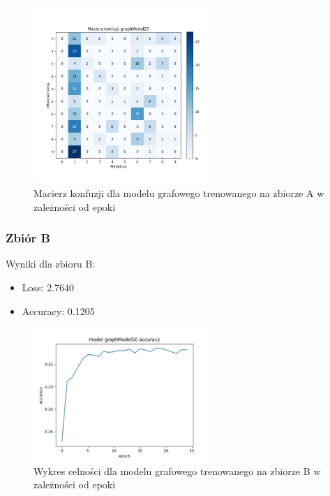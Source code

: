 \documentclass{article}
\begin{document}
\begin{figure}[H]
    \centering
    \includegraphics[width=0.6\textwidth]{../Saves/Graph/graphModel25_confusion.png}
    \caption{Macierz konfuzji dla modelu grafowego trenowanego na zbiorze A w zależności od epoki} 
\end{figure}

\subsubsection{Zbiór B}

Wyniki dla zbioru B:
\begin{itemize}
    \item Loss: 2.7640
    \item Accuracy: 0.1205
\end{itemize}

\begin{figure}[H]
    \centering
    \includegraphics[width=0.6\textwidth]{../Saves/Graph/graphModel50_acc.png}
    \caption{Wykres celności dla modelu grafowego trenowanego na zbiorze B w zależności od epoki} 
\end{figure}
\end{document}
